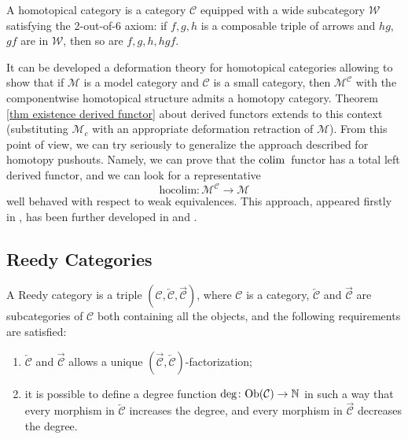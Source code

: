 \begin{defin}
A homotopical category is a category $\mathcal C$ equipped with a wide subcategory $\mathcal W$ satisfying the 2-out-of-6 axiom: if $f,g,h$ is a composable triple of arrows and $hg$, $gf$ are in $\mathcal W$, then so are $f,g,h,hgf$.
\end{defin}

It can be developed a deformation theory for homotopical categories allowing to show that if $\mathcal M$ is a model category and $\mathcal C$ is a small category, then $\mathcal M^{\mathcal C}$ with the componentwise homotopical structure admits a homotopy category. Theorem \ref{thm existence derived functor} about derived functors extends to this context (substituting $\mathcal M_c$ with an appropriate deformation retraction of $\mathcal M$). From this point of view, we can try seriously to generalize the approach described for homotopy pushouts. Namely, we can prove that the $\mathrm{colim} \,$ functor has a total left derived functor, and we can look for a representative
\[
\mathrm{hocolim} \colon \mathcal M^{\mathcal C} \to \mathcal M
\]
well behaved with respect to weak equivalences. This approach, appeared firstly in \cite{dhk}, has been further developed in \cite{shulman} and \cite{riehl}.

\subsection{Reedy Categories}

\begin{defin}
A Reedy category is a triple $\left(\mathcal C, \overleftarrow{\mathcal C}, \overrightarrow{\mathcal C}\right)$, where $\mathcal C$ is a category, $\overleftarrow{\mathcal C}$ and $\overrightarrow{\mathcal C}$ are subcategories of $\mathcal C$ both containing all the objects, and the following requirements are satisfied:
\begin{enumerate}
\item $\overleftarrow{\mathcal C}$ and $\overrightarrow{\mathcal C}$ allows a unique $\left(\overrightarrow{\mathcal C}, \overleftarrow{\mathcal C}\right)$-factorization;
\item it is possible to define a degree function $\deg \colon \mathrm{Ob}(\mathcal C) \to \mathbb{N}$ in such a way that every morphism in $\overleftarrow{\mathcal C}$ increases the degree, and every morphism in $\overrightarrow{\mathcal C}$ decreases the degree.
\end{enumerate}
\end{defin}

